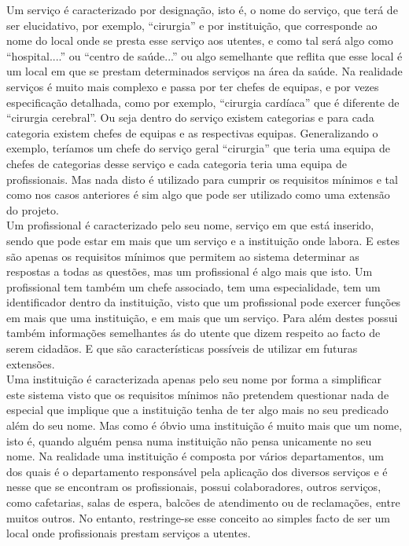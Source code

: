 Um serviço é caracterizado por designação, isto é, o nome do serviço, que terá de ser elucidativo, por exemplo, “cirurgia” e por instituição, que corresponde ao nome do local onde se presta esse serviço aos utentes, e como tal será algo como “hospital....” ou “centro de saúde...” ou algo semelhante que reflita que esse local é um local em que se prestam determinados serviços na área da saúde. Na realidade serviços é muito mais complexo e passa por ter chefes de equipas, e por vezes especificação detalhada, como por exemplo, “cirurgia cardíaca” que é diferente de “cirurgia cerebral”. Ou seja dentro do serviço existem categorias e para cada categoria existem chefes de equipas e as respectivas equipas. Generalizando o exemplo, teríamos um chefe do serviço geral “cirurgia” que teria uma equipa de chefes de categorias desse serviço e cada categoria teria uma equipa de profissionais. Mas nada disto é utilizado para cumprir os requisitos mínimos e tal como nos casos anteriores é sim algo que pode ser utilizado como uma extensão do projeto.  
\\
Um profissional é caracterizado pelo seu nome, serviço em que está inserido, sendo que pode estar em mais que um serviço e a instituição onde labora. E estes são apenas os requisitos mínimos que permitem ao sistema determinar as respostas a todas as questões, mas um profissional é algo mais que isto. Um profissional tem também um chefe associado, tem uma especialidade, tem um identificador dentro da instituição, visto que um profissional pode exercer funções em mais que uma instituição, e em mais que um serviço. Para além destes possui também informações semelhantes ás do utente que dizem respeito ao facto de serem cidadãos. E que são características possíveis de utilizar em futuras extensões. 
\\

Uma instituição é caracterizada apenas pelo seu nome por forma a simplificar este sistema visto que os requisitos mínimos não pretendem questionar nada de especial que implique que a instituição tenha de ter algo mais no seu predicado além do seu nome. Mas como é óbvio uma instituição  é muito mais que um nome, isto é, quando alguém pensa numa instituição não pensa unicamente no seu nome. Na realidade uma instituição é composta por vários departamentos, um dos quais é o departamento responsável pela aplicação dos diversos serviços e é nesse que se encontram os profissionais, possui colaboradores, outros serviços, como cafetarias, salas de espera, balcões de atendimento ou de reclamações, entre muitos outros. No entanto, restringe-se esse conceito ao simples facto de ser um local onde profissionais prestam serviços a utentes.


